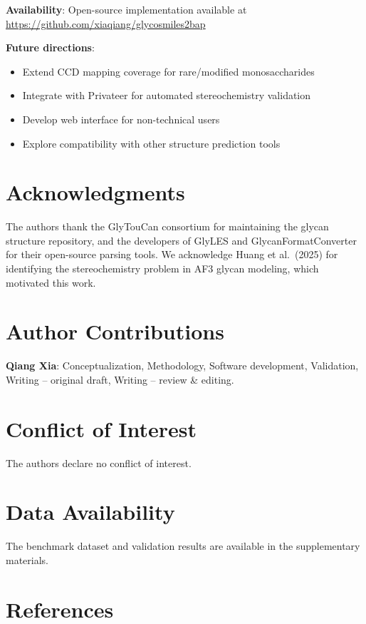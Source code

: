 \documentclass[11pt,a4paper]{article}
\begin{document}
\noindent\textbf{Availability}: Open-source implementation available at \url{https://github.com/xiaqiang/glycosmiles2bap}

\noindent\textbf{Future directions}:
\begin{itemize}
\item Extend CCD mapping coverage for rare/modified monosaccharides
\item Integrate with Privateer for automated stereochemistry validation
\item Develop web interface for non-technical users
\item Explore compatibility with other structure prediction tools
\end{itemize}

\section*{Acknowledgments}

The authors thank the GlyTouCan consortium for maintaining the glycan structure repository, and the developers of GlyLES and GlycanFormatConverter for their open-source parsing tools. We acknowledge Huang et al.\ (2025) for identifying the stereochemistry problem in AF3 glycan modeling, which motivated this work.

\section*{Author Contributions}

\noindent\textbf{Qiang Xia}: Conceptualization, Methodology, Software development, Validation, Writing -- original draft, Writing -- review \& editing.

\section*{Conflict of Interest}

The authors declare no conflict of interest.

\section*{Data Availability}

The benchmark dataset and validation results are available in the supplementary materials.

\section*{References}
\end{document}
